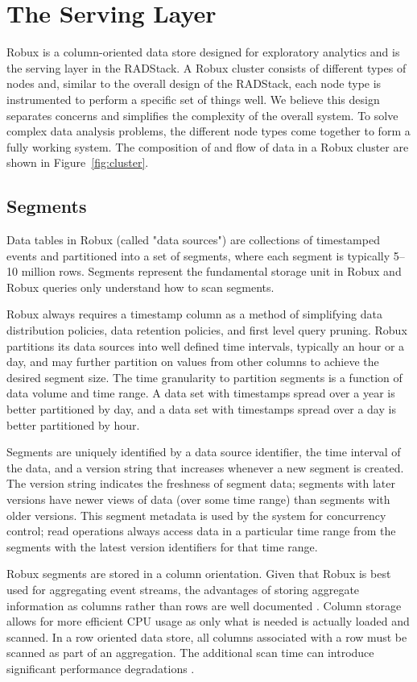 \documentclass{vldb}
\begin{document}
\section{The Serving Layer}
\label{sec:serving}
Robux is a column-oriented data store designed for exploratory analytics and is
the serving layer in the RADStack. A Robux cluster consists of different types
of nodes and, similar to the overall design of the RADStack, each node type is
instrumented to perform a specific set of things well. We believe this design
separates concerns and simplifies the complexity of the overall system. To
solve complex data analysis problems, the different node types come together to
form a fully working system. The composition of and flow of data in a Robux
cluster are shown in Figure~\ref{fig:cluster}.

\subsection{Segments}
\label{sec:segments}
Data tables in Robux (called "data sources") are collections of timestamped
events and partitioned into a set of segments, where each segment is typically
5–10 million rows. Segments represent the fundamental storage unit in
Robux and Robux queries only understand how to scan segments. 

Robux always requires a timestamp column as a method of simplifying data
distribution policies, data retention policies, and first level query pruning.
Robux partitions its data sources into well defined time intervals, typically
an hour or a day, and may further partition on values from other columns to
achieve the desired segment size. The time granularity to partition segments is
a function of data volume and time range. A data set with timestamps spread
over a year is better partitioned by day, and a data set with timestamps spread
over a day is better partitioned by hour. 

Segments are uniquely identified by a data source identifier, the time interval
of the data, and a version string that increases whenever a new segment is
created. The version string indicates the freshness of segment data; segments
with later versions have newer views of data (over some time range) than
segments with older versions. This segment metadata is used by the system for
concurrency control; read operations always access data in a particular time
range from the segments with the latest version identifiers for that time
range.

Robux segments are stored in a column orientation. Given that Robux is best
used for aggregating event streams, the advantages of storing aggregate
information as columns rather than rows are well documented
\cite{abadi2008column}. Column storage allows for more efficient CPU usage as
only what is needed is actually loaded and scanned.  In a row oriented data
store, all columns associated with a row must be scanned as part of an
aggregation. The additional scan time can introduce significant performance
degradations \cite{abadi2008column}.
\end{document}
